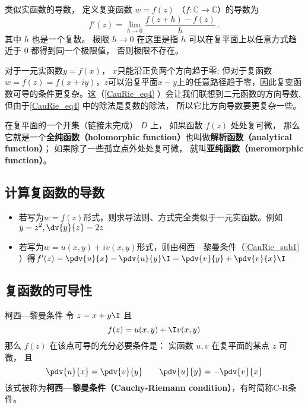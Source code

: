 
\begin{issues}
\issueTODO
\end{issues}


\begin{definition}{}
类似实函数的导数， 定义复变函数 $w = f(z)$ （$f:\mathbb C\to \mathbb C$）的导数为
\begin{equation}\label{CauRie_eq4}
f'(z) = \lim_{h\to 0} \frac{f(z + h) - f(z)}{h}~.
\end{equation}
其中 $h$ 也是一个复数。 极限 $h \to 0$ 在这里是指 $h$ 可以在复平面上以任意方式趋近于 $0$ 都得到同一个极限值， 否则极限不存在。
\end{definition}

对于一元实函数$y=f(x)$， $x$只能沿正负两个方向趋于零; 但对于复函数$w=f(z)=f(x+iy)$，$z$可以沿复平面$x-y$上的任意路径趋于零，因此复变函数可导的条件更复杂。这（\autoref{CauRie_eq4} ）会让我们联想到二元函数的方向导数, 但由于\autoref{CauRie_eq4} 中的除法是复数的除法， 所以它比方向导数要更复杂一些。

在复平面的一个开集（链接未完成） $D$ 上， 如果函数 $f(z)$ 处处复可微， 那么它就是一个\textbf{全纯函数（holomorphic function）}也叫做\textbf{解析函数（analytical function）}； 如果除了一些孤立点外处处复可微， 就叫\textbf{亚纯函数（meromorphic function）}。

\subsection{计算复函数的导数}
\begin{itemize}
\item 若写为$w=f(z)$形式，则求导法则、方式完全类似于一元实函数。例如$y=z^2, \dv{y}{z}=2z$
\item 若写为$w=u(x,y)+iv(x,y)$形式，则由柯西—黎曼条件（\autoref{CauRie_sub1} ）得$f'(z) = \pdv{u}{x} -\pdv{u}{y} \I = \pdv{v}{y} + \pdv{v}{x}\I$
\end{itemize}

\subsection{复函数的可导性}\label{CauRie_sub1}

\begin{theorem}{柯西—黎曼条件}
令 $z = x + y\I$ 且
\begin{equation}
f(z) = u(x, y) + \I v(x, y)
\end{equation}
那么 $f(z)$ 在该点可导的充分必要条件是： 实函数 $u,v$ 在复平面的某点 $z$ 可微， 且
\begin{equation}\label{CauRie_eq1}
\pdv{u}{x} = \pdv{v}{y} \qquad
\pdv{u}{y} = - \pdv{v}{x}
\end{equation}
该式被称为\textbf{柯西—黎曼条件（Cauchy-Riemann condition）}，有时简称C-R条件。
\end{theorem}

